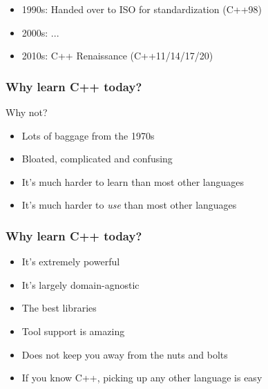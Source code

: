 \documentclass[aspectratio=43]{beamer}
\begin{document}
\begin{frame}
\begin{itemize}[<+->]
  \item 1990s: Handed over to ISO for standardization (C++98)
  \item 2000s: ...
  \item 2010s: C++ Renaissance (C++11/14/17/20)
  \end{itemize}
\end{frame}


\begin{frame}
  \frametitle{Why learn C++ today?}
  \pause
  Why not?
  \pause
  \begin{itemize}[<+->]
  \item Lots of baggage from the 1970s
  \item Bloated, complicated and confusing
  \item It's much harder to learn than most other languages
  \item It's much harder to \emph{use} than most other languages
  \end{itemize}
\end{frame}


\begin{frame}
  \frametitle{Why learn C++ today?}
  \pause
  \begin{itemize}[<+->]
  \item It's extremely powerful
  \item It's largely domain-agnostic
  \item The best libraries
  \item Tool support is amazing
  \item Does not keep you away from the nuts and bolts
  \item If you know C++, picking up any other language is easy
  \end{itemize}
\end{frame}
\end{document}
